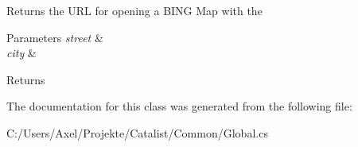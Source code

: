 Returns the U\+RL for opening a B\+I\+NG Map with the 


\begin{DoxyParams}{Parameters}
{\em street} & \\
\hline
{\em city} & \\
\hline
\end{DoxyParams}
\begin{DoxyReturn}{Returns}

\end{DoxyReturn}


The documentation for this class was generated from the following file\+:\begin{DoxyCompactItemize}
\item 
C\+:/\+Users/\+Axel/\+Projekte/\+Catalist/\+Common/Global.\+cs\end{DoxyCompactItemize}
